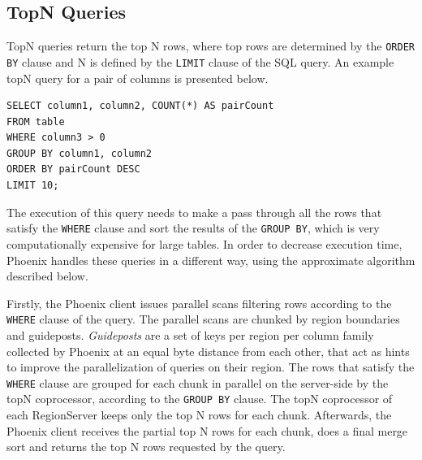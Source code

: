\subsection{TopN Queries}

TopN queries return the top N rows, where top rows are determined by the \texttt{ORDER BY} clause and N is defined by the \texttt{LIMIT} clause of the SQL query. An example topN query for a pair of columns is presented below.

\begin{lstlisting}[language=PhoenixSQL]
SELECT column1, column2, COUNT(*) AS pairCount
FROM table
WHERE column3 > 0
GROUP BY column1, column2
ORDER BY pairCount DESC
LIMIT 10;
\end{lstlisting}

The execution of this query needs to make a pass through all the rows that satisfy the \texttt{WHERE} clause and sort the results of the \texttt{GROUP BY}, which is very computationally expensive for large tables. In order to decrease execution time, Phoenix handles these queries in a different way, using the approximate algorithm described below.

Firstly, the Phoenix client issues parallel scans filtering rows according to the \texttt{WHERE} clause of the query. The parallel scans are chunked by region boundaries and guideposts. \emph{Guideposts} are a set of keys per region per column family collected by Phoenix at an equal byte distance from each other, that act as hints to improve the parallelization of queries on their region. The rows that satisfy the \texttt{WHERE} clause are grouped for each chunk in parallel on the server-side by the topN coprocessor, according to the \texttt{GROUP BY} clause. The topN coprocessor of each RegionServer keeps only the top N rows for each chunk. Afterwards, the Phoenix client receives the partial top N rows for each chunk, does a final merge sort and returns the top N rows requested by the query.


\cleardoublepage
